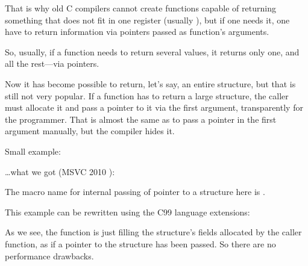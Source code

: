 That is why old C compilers cannot create functions capable of returning something that does not fit in one 
register (usually \Tint), but if one needs it, one have to return information via pointers passed 
as function's arguments.

So, usually, if a function needs to return several values, it returns only one, and 
all the rest---via pointers.

Now it has become possible to return, let's say, an entire structure, but that is still not very popular. 
If a function has to return a large structure, the \gls{caller} must allocate it and pass a pointer to it via the first argument, transparently for the programmer. 
That is almost the same as to pass a pointer in the first argument manually, but the compiler hides it.

Small example:



\dots what we got (MSVC 2010 \Ox):



The macro name for internal passing of pointer to a structure here is .

This example can be rewritten using
the C99 language extensions:





As we see, the function is just filling the structure's fields allocated by
the caller function,
as if a pointer to the structure has been passed.
So there are no performance drawbacks.
